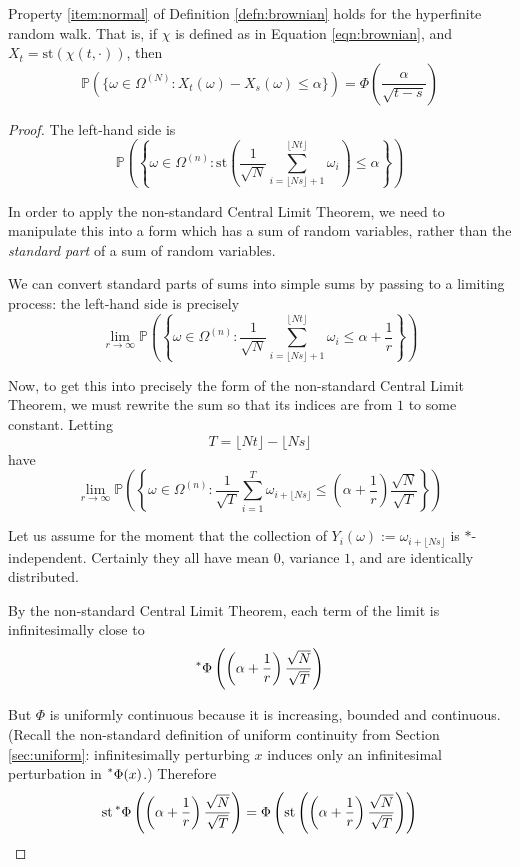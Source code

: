 \documentclass[11pt]{amsart}
\theoremstyle{remark}
\newcommand{\st}{\mathrm{st}}
\newcommand{\hyp}[1][\mathbb{R}]{\prescript{*}{}{#1}}
\newcommand{\gaussian}{\Phi}
\begin{document}
\begin{thm} \label{thm:brownian3}
Property \ref{item:normal} of Definition \ref{defn:brownian} holds for the hyperfinite random walk.
That is, if $\chi$ is defined as in Equation \ref{eqn:brownian}, and $X_t = \st(\chi(t, \cdot))$, then $$\mathbb{P}(\{ \omega \in \Omega^{(N)} : X_t(\omega) - X_s(\omega) \leq \alpha \}) = \gaussian \left(\frac{\alpha}{\sqrt{t-s}} \right)$$
\end{thm}
\begin{proof}
The left-hand side is $$\mathbb{P}\left(\left\{ \omega \in \Omega^{(n)}: \st \left( \frac{1}{\sqrt{N}} \sum_{i=\lfloor N s \rfloor+1}^{\lfloor N t \rfloor} \omega_i \right) \leq \alpha \right\} \right)$$

In order to apply the non-standard Central Limit Theorem, we need to manipulate this into a form which has a sum of random variables, rather than the \emph{standard part} of a sum of random variables.

We can convert standard parts of sums into simple sums by passing to a limiting process: the left-hand side is precisely
$$\lim_{r \to \infty} \mathbb{P}\left(\left\{ \omega \in \Omega^{(n)}: \frac{1}{\sqrt{N}} \sum_{i=\lfloor N s \rfloor+1}^{\lfloor N t \rfloor} \omega_i \leq \alpha+\frac{1}{r} \right\} \right)$$

Now, to get this into precisely the form of the non-standard Central Limit Theorem, we must rewrite the sum so that its indices are from $1$ to some constant.
Letting $$T = \lfloor N t \rfloor - \lfloor N s \rfloor$$ have
$$\lim_{r \to \infty} \mathbb{P} \left( \left \{ \omega \in \Omega^{(n)} : \frac{1}{\sqrt{T}} \sum_{i=1}^{T} \omega_{i+\lfloor Ns \rfloor} \leq \left(\alpha + \frac{1}{r} \right) \frac{\sqrt{N}}{\sqrt{T}} \right \} \right)$$

Let us assume for the moment that the collection of $Y_i(\omega) := \omega_{i+\lfloor Ns \rfloor}$ is $*$-independent.
Certainly they all have mean $0$, variance $1$, and are identically distributed.

By the non-standard Central Limit Theorem, each term of the limit is infinitesimally close to $$\hyp[\gaussian]\left( \left( \alpha+\frac{1}{r} \right) \frac{\sqrt{N}}{\sqrt{T}}\right) $$

But $\gaussian$ is uniformly continuous because it is increasing, bounded and continuous.
(Recall the non-standard definition of uniform continuity from Section \ref{sec:uniform}: infinitesimally perturbing $x$ induces only an infinitesimal perturbation in $\hyp[\gaussian](x)$.)
Therefore $$\st \hyp[\gaussian]\left( \left( \alpha+\frac{1}{r} \right) \frac{\sqrt{N}}{\sqrt{T}}\right) = \gaussian \left(\st \left( \left( \alpha+\frac{1}{r} \right) \frac{\sqrt{N}}{\sqrt{T}} \right) \right)$$


\end{proof}
\end{document}
